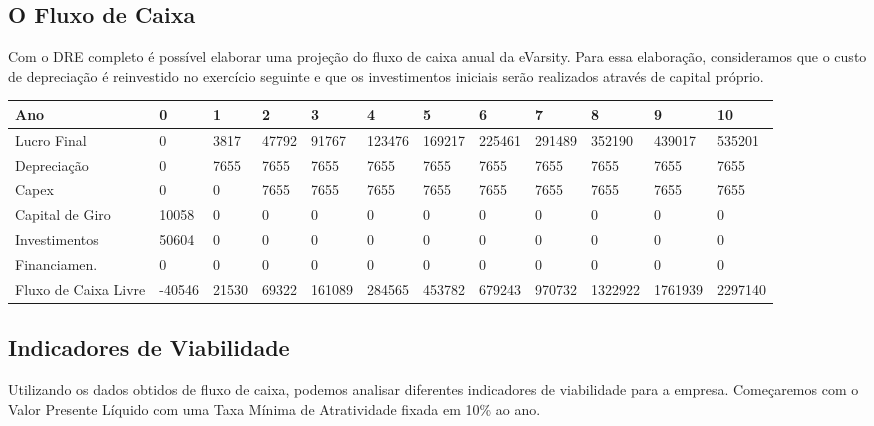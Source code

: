 \documentclass[a4paper, 12pt]{paper}
\begin{document}
\begin{landscape}
\subsection{O Fluxo de Caixa}
Com o DRE completo é possível elaborar uma projeção do fluxo de caixa anual da eVarsity. Para essa elaboração, consideramos que o custo de depreciação é reinvestido no exercício seguinte e que os investimentos iniciais serão realizados através de capital próprio.

	\begin{table}[ht]

		\begin{tabular}{p{5cm}p{1.2cm}p{1.2cm}p{1.2cm}p{1.2cm}p{1.2cm}p{1.2cm}p{1.2cm}p{1.2cm}p{1.2cm}p{1.2cm}p{1.2cm}}
		\hline
			\cellcolor{gray}Ano & \cellcolor{gray}0 & \cellcolor{gray}1 & \cellcolor{gray}2 & \cellcolor{gray}3 & \cellcolor{gray}4 & \cellcolor{gray}5 & \cellcolor{gray}6 & \cellcolor{gray}7 & \cellcolor{gray}8 &\cellcolor{gray} 9 & \cellcolor{gray}10 \\ \hline
	Lucro Final & 0 & 3817 & 47792 & 91767 & 123476 & 169217 & 225461 & 291489 & 352190 & 439017 & 535201 \\ \hline
	Depreciação & 0 & 7655 & 7655 & 7655 & 7655 & 7655 & 7655 & 7655 & 7655 & 7655 & 7655 \\ \hline
	Capex & 0 & 0 & 7655 & 7655 & 7655 & 7655 & 7655 & 7655 & 7655 & 7655 & 7655 \\ \hline
	Capital de Giro & 10058 & 0 & 0 & 0 & 0 & 0 & 0 & 0 & 0 & 0 & 0 \\ \hline
	Investimentos & 50604 & 0 & 0 & 0 & 0 & 0 & 0 & 0 & 0 & 0 & 0 \\ \hline
	Financiamen. & 0 & 0 & 0 & 0 & 0 & 0 & 0 & 0 & 0 & 0 & 0 \\ \hline
	Fluxo de Caixa Livre & -40546 & 21530 & 69322 & 161089 & 284565 & 453782 & 679243 & 970732 & 1322922 & 1761939 & 2297140 \\ \hline
		\end{tabular}
	\end{table}

\end{landscape}

\subsection{Indicadores de Viabilidade}
Utilizando os dados obtidos de fluxo de caixa, podemos analisar diferentes indicadores de viabilidade para a empresa. Começaremos com o Valor Presente Líquido com uma Taxa Mínima de Atratividade fixada em 10\% ao ano.
\end{document}
